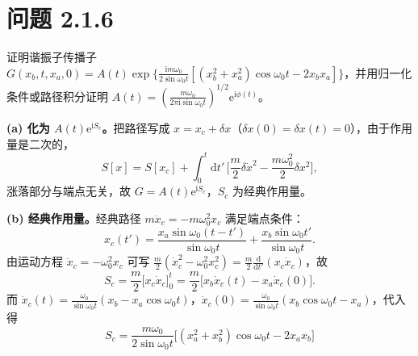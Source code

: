 \section*{问题 2.1.6}
\begin{problem}
证明谐振子传播子 $G(x_b,t,x_a,0)=A(t)\exp\{\frac{\mathrm{i}m\omega_0}{2\sin\omega_0t}[(x_b^2+x_a^2)\cos\omega_0t-2x_bx_a]\}$，并用归一化条件或路径积分证明 $A(t)=(\frac{m\omega_0}{2\pi\mathrm{i}\sin\omega_0t})^{1/2}\mathrm{e}^{\mathrm{i}\phi(t)}$。
\end{problem}
\solution
\textbf{(a) 化为 $A(t)\mathrm{e}^{\mathrm{i}S_c}$。}把路径写成 $x=x_c+\delta x$（$\delta x(0)=\delta x(t)=0$），由于作用量是二次的，
\begin{equation*}
S[x]=S[x_c]+\int_0^t\mathrm{d}t'\,\Big[\frac m2\delta\dot x^2-\frac{m\omega_0^2}2\delta x^2\Big],
\end{equation*}
涨落部分与端点无关，故 $G=A(t)\mathrm{e}^{\mathrm{i}S_c}$，$S_c$ 为经典作用量。

\textbf{(b) 经典作用量。}经典路径 $m\ddot x_c=-m\omega_0^2x_c$ 满足端点条件：
\begin{equation*}
x_c(t')=\frac{x_a\sin\omega_0(t-t')}{\sin\omega_0t}+\frac{x_b\sin\omega_0t'}{\sin\omega_0t}.
\end{equation*}
由运动方程 $\ddot x_c=-\omega_0^2x_c$ 可写 $\frac{m}{2}(\dot x_c^2-\omega_0^2x_c^2)=\frac m2\frac{\mathrm{d}}{\mathrm{d}t'}(x_c\dot x_c)$，故
\begin{equation*}
S_c=\frac m2\big[x_c\dot x_c\big]_0^{t}
=\frac m2\big[x_b\dot x_c(t)-x_a\dot x_c(0)\big].
\end{equation*}
而 $\dot x_c(t)=\frac{\omega_0}{\sin\omega_0t}(x_b-x_a\cos\omega_0t)$，$\dot x_c(0)=\frac{\omega_0}{\sin\omega_0t}(x_b\cos\omega_0t-x_a)$，代入得
\begin{equation*}
\boxed{\;S_c=\frac{m\omega_0}{2\sin\omega_0t}\big[(x_a^2+x_b^2)\cos\omega_0t-2x_ax_b\big]\;}
\end{equation*}

